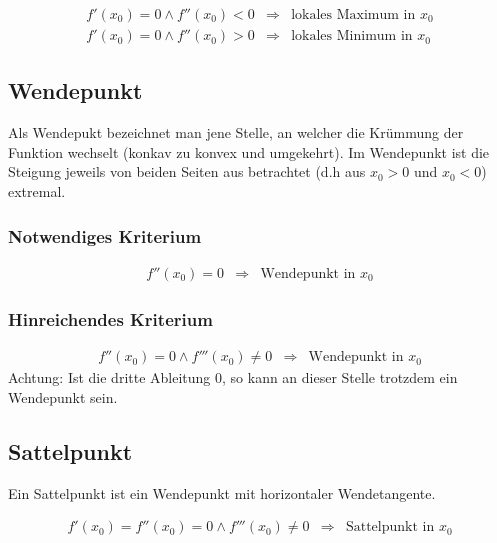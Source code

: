 \[ \boxed{ \begin{matrix}
f'(x_0) = 0 \land f''(x_0) < 0 & \Rightarrow & \text{lokales Maximum in $x_0$} \\
f'(x_0) = 0 \land f''(x_0) > 0 & \Rightarrow & \text{lokales Minimum in $x_0$} 
\end{matrix} } \]

\subsection{Wendepunkt}
Als Wendepukt bezeichnet man jene Stelle, an welcher die Krümmung der Funktion wechselt (konkav zu konvex und umgekehrt).
Im Wendepunkt ist die Steigung jeweils von beiden Seiten aus betrachtet (d.h aus $x_0 > 0$ und $x_0<0$) extremal.

\subsubsection{Notwendiges Kriterium}
\[ \boxed{ \begin{matrix}
f''(x_0) = 0 & \Rightarrow & \text{Wendepunkt in $x_0$}
\end{matrix} } \]

\subsubsection{Hinreichendes Kriterium}
\[ \boxed{ \begin{matrix}
f''(x_0) = 0 \land f'''(x_0) \neq 0 & \Rightarrow & \text{Wendepunkt in $x_0$}
\end{matrix} } \]
Achtung: Ist die dritte Ableitung 0, so kann an dieser Stelle trotzdem ein Wendepunkt sein. 

\subsection{Sattelpunkt}
Ein Sattelpunkt ist ein Wendepunkt mit horizontaler Wendetangente.

\[ \boxed{ \begin{matrix}
f'(x_0) =  f''(x_0) = 0 \land f'''(x_0) \neq 0 & \Rightarrow & \text{Sattelpunkt in $x_0$}
\end{matrix} } \]
